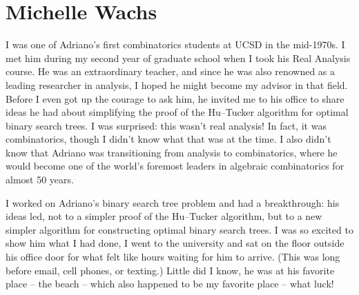 \documentclass{notices}
\begin{document}
\section*{Michelle Wachs}
I was one of Adriano’s first combinatorics students at UCSD in the mid-1970s. I met him during my second year of graduate school when I took his Real Analysis course. He was an extraordinary teacher, and since he was also renowned as a leading researcher in analysis, I hoped he might become my advisor in that field.  Before I even got up the courage to ask him, he invited me to his office to share  ideas he had about simplifying the proof of the 
Hu--Tucker algorithm for optimal binary search trees. I was surprised: this wasn’t real analysis! In fact, it was combinatorics, though I didn’t know what that was at the time. I also didn’t know that Adriano was transitioning from analysis to combinatorics, where he would become one of the world's foremost leaders in algebraic combinatorics for almost 50 years.

I worked on Adriano's binary search tree problem and had a breakthrough:  his ideas led, not to a simpler proof of the Hu--Tucker algorithm, but  to a  new simpler algorithm for constructing optimal binary search trees. 
I was so excited to show him what I had done, I went to the university and sat on the floor outside his office door for what felt like hours waiting  for him to arrive. (This was long before email, cell phones, or texting.)  Little did I know, he was at his favorite place -- the beach -- which also happened to be my favorite place -- what luck!
\end{document}
